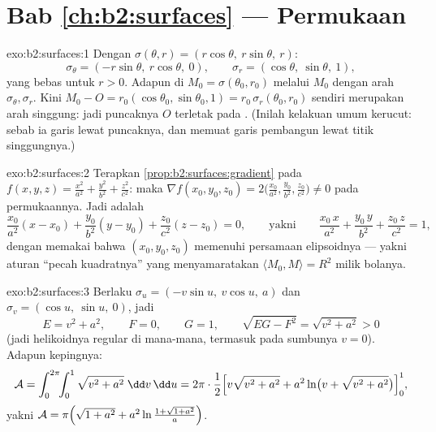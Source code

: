 \section*{Bab \ref{ch:b2:surfaces} --- Permukaan}

\begin{solution}{exo:b2:surfaces:1}
Dengan $\sigma(\theta, r) = (r\cos\theta,\ r\sin\theta,\ r)$:
\[
\sigma_\theta = (-r\sin\theta,\ r\cos\theta,\ 0),
\qquad
\sigma_r = (\cos\theta,\ \sin\theta,\ 1),
\]
yang bebas untuk $r > 0$. Adapun  di $M_0 =
\sigma(\theta_0, r_0)$ melalui $M_0$ dengan arah
$\sigma_\theta, \sigma_r$. Kini $M_0 - O = r_0(\cos\theta_0,
\sin\theta_0, 1) = r_0\,\sigma_r(\theta_0, r_0)$ sendiri merupakan
arah singgung: jadi puncaknya $O$ terletak pada . (Inilah
kelakuan umum kerucut: sebab ia  garis lewat
puncaknya, dan  memuat garis pembangun lewat
titik singgungnya.)
\end{solution}

\begin{solution}{exo:b2:surfaces:2}
Terapkan \cref{prop:b2:surfaces:gradient} pada $f(x,y,z) =
\frac{x^2}{a^2} + \frac{y^2}{b^2} + \frac{z^2}{c^2}$: maka $\nabla
f(x_0,y_0,z_0) = 2\bigl(\frac{x_0}{a^2}, \frac{y_0}{b^2},
\frac{z_0}{c^2}\bigr) \neq 0$ pada permukaannya. Jadi  adalah
\[
\frac{x_0}{a^2}(x - x_0) + \frac{y_0}{b^2}(y - y_0)
+ \frac{z_0}{c^2}(z - z_0) = 0,
\qquad\text{yakni}\qquad
\frac{x_0\,x}{a^2} + \frac{y_0\,y}{b^2} + \frac{z_0\,z}{c^2} = 1,
\]
dengan memakai bahwa $(x_0, y_0, z_0)$ memenuhi persamaan elipsoidnya ---
yakni aturan ``pecah kuadratnya'' yang menyamaratakan $\langle
M_0, M \rangle = R^2$ milik bolanya.
\end{solution}

\begin{solution}{exo:b2:surfaces:3}
Berlaku $\sigma_u = (-v\sin u,\ v\cos u,\ a)$ dan $\sigma_v = (\cos u,\
\sin u,\ 0)$, jadi
\[
E = v^2 + a^2, \qquad F = 0, \qquad G = 1,
\qquad
\sqrt{EG - F^2} = \sqrt{v^2 + a^2} > 0
\]
(jadi helikoidnya regular di mana-mana, termasuk pada sumbunya $v =
0$). Adapun \omterm{def:b2:surfaces:area}{luas} kepingnya:
\[
\mathcal{A} = \int_0^{2\pi}\!\!\int_0^1
\sqrt{v^2 + a^2}\;\dd v\,\dd u
= 2\pi\cdot\frac12\Bigl[v\sqrt{v^2 + a^2}
+ a^2\ln\bigl(v + \sqrt{v^2 + a^2}\bigr)\Bigr]_0^1 ,
\]
yakni $\mathcal{A} = \pi\Bigl(\sqrt{1 + a^2} +
a^2\ln\frac{1 + \sqrt{1 + a^2}}{a}\Bigr)$.
\end{solution}

